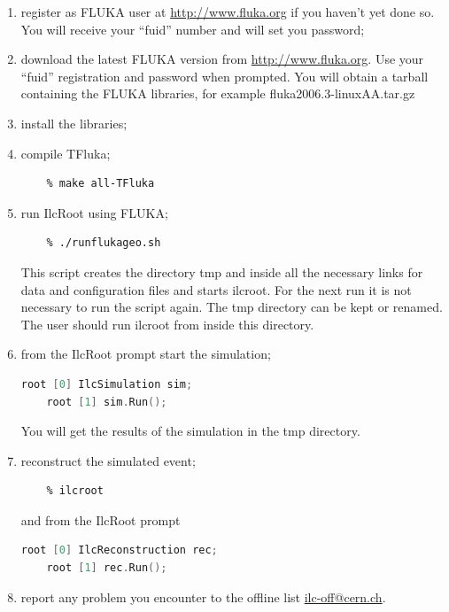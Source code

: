 \documentclass[12pt,a4paper,twoside]{article}
\begin{document}
\begin{enumerate}

\item register as FLUKA user at \url{http://www.fluka.org} if you
  haven't yet done so. You will receive your ``fuid'' number and will set
  you password;

\item download the latest FLUKA version from
  \url{http://www.fluka.org}. Use your ``fuid'' registration and
  password when prompted. You will obtain a tarball containing the
  FLUKA libraries, for example fluka2006.3-linuxAA.tar.gz

\item install the libraries;

  

\item compile TFluka;

  \begin{lstlisting}[language=sh]
    % cd $ILC_ROOT
    % make all-TFluka
  \end{lstlisting}

\item run IlcRoot using FLUKA;
  \begin{lstlisting}[language=sh]
    % cd $ILC_ROOT/TFluka/scripts
    % ./runflukageo.sh
  \end{lstlisting}

  This script creates the directory tmp and inside all the necessary
  links for data and configuration files and starts ilcroot. For the
  next run it is not necessary to run the script again. The tmp
  directory can be kept or renamed. The user should run ilcroot from
  inside this directory.

\item from the IlcRoot prompt start the simulation;
  \begin{lstlisting}[language=C++]
    root [0] IlcSimulation sim;
    root [1] sim.Run();
  \end{lstlisting}

  You will get the results of the simulation in the tmp directory.

\item reconstruct the simulated event;
  \begin{lstlisting}[language=sh]
    % cd tmp
    % ilcroot
  \end{lstlisting}

  and from the IlcRoot prompt
  \begin{lstlisting}[language=C++]
    root [0] IlcReconstruction rec;
    root [1] rec.Run();
  \end{lstlisting}

\item report any problem you encounter to the offline list \url{ilc-off@cern.ch}.

\end{enumerate}
\end{document}
